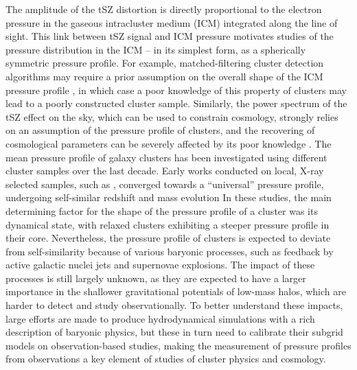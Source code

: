 The amplitude of the tSZ distortion is directly proportional to the electron pressure in the gaseous intracluster medium (ICM) integrated along the line of sight.
This link between tSZ signal and ICM pressure motivates studies of the pressure distribution in the ICM -- in its simplest form, as a spherically symmetric pressure profile.
For example, matched-filtering cluster detection algorithms may require a prior assumption on the overall shape of the ICM pressure profile \citep[\eg][]{melin_comparison_2012}, in which case a poor knowledge of this property of clusters may lead to a poorly constructed cluster sample.
Similarly, the power spectrum of the tSZ effect on the sky, which can be used to constrain cosmology, strongly relies on an assumption of the pressure profile of clusters, and the recovering of cosmological parameters can be severely affected by its poor knowledge \citep{ruppin_impact_2019}.
The mean pressure profile of galaxy clusters has been investigated using different cluster samples over the last decade.
Early works conducted on local, X-ray selected samples, such as \citet[][hereafter \aten]{arnaud_universal_2010}, converged towards a ``universal'' pressure profile, undergoing self-similar redshift and mass evolution \citep[see also \eg][]{battaglia_cluster_2012-1, planck_collaboration_planck_2013}
In these studies, the main determining factor for the shape of the pressure profile of a cluster was its dynamical state, with relaxed clusters exhibiting a steeper pressure profile in their core.
Nevertheless, the pressure profile of clusters is expected to deviate from self-similarity because of various baryonic processes, such as feedback by active galactic nuclei jets and supernovae explosions.
The impact of these processes is still largely unknown, as they are expected to have a larger importance in the shallower gravitational potentials of low-mass halos, which are harder to detect and study observationally.
To better understand these impacts, large efforts are made to produce hydrodynamical simulations with a rich description of baryonic physics, but these in turn need to calibrate their subgrid models on observation-based studies, making the measurement of pressure profiles from observations a key element of studies of cluster physics and cosmology.

